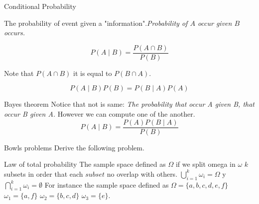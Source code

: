 \documentclass{beamer}
\begin{document}
\begin{frame}{Conditional Probability}

The probability of event given a "information".\emph{Probability of $A$ occur given $B$ occurs. }

\begin{equation}
P(A \mid B) = \frac{P(A \cap B)}{P(B)}
\end{equation}

Note that $P(A \cap B)$ it is equal to $P(B \cap A)$.

\begin{equation}
P(A \mid B)P(B) = P(B \mid A)P(A)
\end{equation}
\end{frame}


\begin{frame}{Bayes theorem}
Notice that not is same: 
\emph{The probability that occur A given B, that occur B given A.} However we can compute one of the another.
\begin{equation}
P(A \mid B) = \frac{P(A) P(B \mid A)}{P(B)}
\end{equation}
\end{frame}



\begin{frame}{Bowls problems}
Derive the following problem.
\end{frame}




\begin{frame}{Law of total probability}
The sample space defined as $\Omega$ 
if we split omega in $\omega$ $k$ subsets in order that each $subset$ no overlap with others.
$\bigcup_{i=1}^{k} \omega_{i} = \Omega $ y $
\bigcap_{i=1}^{k} \omega_{i} = \emptyset
$
For instance the sample space defined as $ \Omega= \lbrace a ,b,c,d,e,f\rbrace$
$\omega_{1}=\lbrace a,f \rbrace$  $\omega_{2}=\lbrace b,c,d \rbrace  $ $ \omega_{3}=\lbrace e \rbrace $.
\end{frame}
\end{document}
